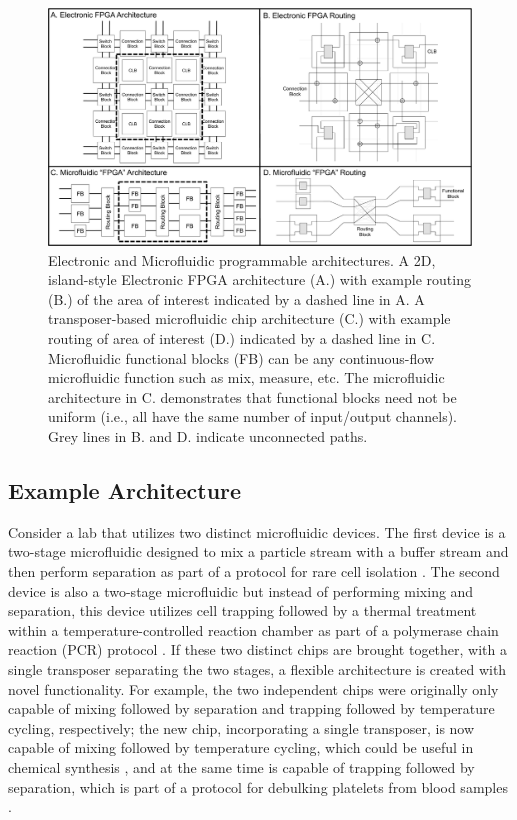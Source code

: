 \begin{figure}[h]
  \begin{minipage}[t]{0.99\linewidth}\centering
    \includegraphics[width=15cm]{fig9.pdf}
    \medskip
  \end{minipage}\hfill
  \caption[Electronic and Microfludic programmable architectures]{Electronic and Microfluidic programmable architectures. A 2D, island-style Electronic FPGA architecture (A.) with example routing (B.) of the area of interest indicated by a dashed line in A. A transposer-based microfluidic chip architecture (C.) with example routing of area of interest (D.) indicated by a dashed line in C. Microfluidic functional blocks (FB) can be any continuous-flow microfluidic function such as mix, measure, etc. The microfluidic architecture in C. demonstrates that functional blocks need not be uniform (i.e., all have the same number of input/output channels). Grey lines in B. and D. indicate unconnected paths.}
	\label{fig:fpgaArchAndRouting}
\end{figure}

\subsection{Example Architecture}
\label{sec:example}
Consider a lab that utilizes two distinct microfluidic devices. The first device is a two-stage microfluidic designed to mix a particle stream with a buffer stream and then perform separation as part of a protocol for rare cell isolation \cite{pamme2007continuous}. The second device is also a two-stage microfluidic but instead of performing mixing and separation, this device utilizes cell trapping followed by a thermal treatment within a temperature-controlled reaction chamber as part of a polymerase chain reaction (PCR) protocol \cite{zhang2006pcr}. If these two distinct chips are brought together, with a single transposer separating the two stages, a flexible architecture is created with novel functionality. For example, the two independent chips were originally only capable of mixing followed by separation and trapping followed by temperature cycling, respectively; the new chip, incorporating a single transposer, is now capable of mixing followed by temperature cycling, which could be useful in chemical synthesis \cite{jensen2014tools}, and at the same time is capable of trapping followed by separation, which is part of a protocol for debulking platelets from blood samples \cite{shields2015microfluidic}.

